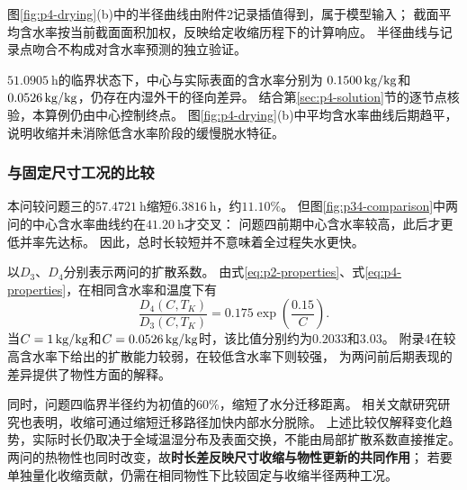 图\ref{fig:p4-drying}(b)中的半径曲线由附件2记录插值得到，属于模型输入；
截面平均含水率按当前截面面积加权，反映给定收缩历程下的计算响应。
半径曲线与记录点吻合不构成对含水率预测的独立验证。

$51.0905\ \mathrm{h}$的临界状态下，中心与实际表面的含水率分别为
$0.1500\,\mathrm{kg/kg}$和$0.0526\,\mathrm{kg/kg}$，仍存在内湿外干的径向差异。
结合第\ref{sec:p4-solution}节的逐节点核验，本算例仍由中心控制终点。
图\ref{fig:p4-drying}(b)中平均含水率曲线后期趋平，
说明收缩并未消除低含水率阶段的缓慢脱水特征。

\subsubsection{与固定尺寸工况的比较}

本问较问题三的$57.4721\ \mathrm{h}$缩短$6.3816\ \mathrm{h}$，约$11.10\%$。
但图\ref{fig:p34-comparison}中两问的中心含水率曲线约在$41.20\ \mathrm{h}$才交叉：
问题四前期中心含水率较高，此后才更低并率先达标。
因此，总时长较短并不意味着全过程失水更快。


以$D_3$、$D_4$分别表示两问的扩散系数。
由式\eqref{eq:p2-properties}、式\eqref{eq:p4-properties}，在相同含水率和温度下有
\begin{equation}
  \frac{D_4(C,T_K)}{D_3(C,T_K)}
    =0.175\exp\!\left(\frac{0.15}{C}\right).
  \label{eq:p34-diffusivity-ratio}
\end{equation}
当$C=1\,\mathrm{kg/kg}$和$C=0.0526\,\mathrm{kg/kg}$时，该比值分别约为$0.2033$和$3.03$。
附录4在较高含水率下给出的扩散能力较弱，在较低含水率下则较强，
为两问前后期表现的差异提供了物性方面的解释。

同时，问题四临界半径约为初值的$60\%$，缩短了水分迁移距离。
相关文献研究研究也表明，收缩可通过缩短迁移路径加快内部水分脱除\cite{radish-shrinkage}。
上述比较仅解释变化趋势，实际时长仍取决于全域温湿分布及表面交换，不能由局部扩散系数直接推定。
两问的热物性也同时改变，故\textbf{时长差反映尺寸收缩与物性更新的共同作用}；
若要单独量化收缩贡献，仍需在相同物性下比较固定与收缩半径两种工况。
